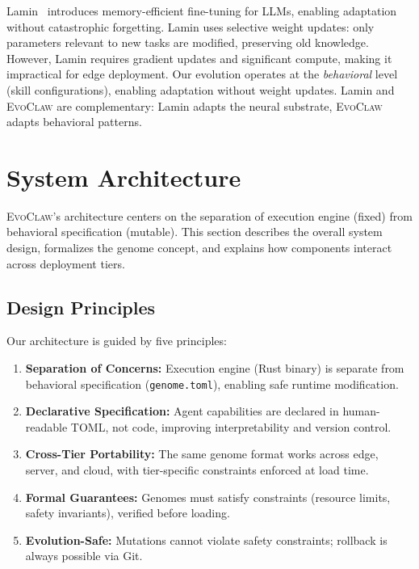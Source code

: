 \documentclass{article}
\newcommand{\evoclaw}{\textsc{EvoClaw}}
\newcommand{\genome}{\texttt{genome.toml}}
\begin{document}
Lamin~\cite{lamar2023lamin} introduces memory-efficient fine-tuning for LLMs, enabling adaptation without catastrophic forgetting. Lamin uses selective weight updates: only parameters relevant to new tasks are modified, preserving old knowledge. However, Lamin requires gradient updates and significant compute, making it impractical for edge deployment. Our evolution operates at the \textit{behavioral} level (skill configurations), enabling adaptation without weight updates. Lamin and \evoclaw{} are complementary: Lamin adapts the neural substrate, \evoclaw{} adapts behavioral patterns.


\section{System Architecture}
\label{sec:architecture}

\evoclaw{}'s architecture centers on the separation of execution engine (fixed) from behavioral specification (mutable). This section describes the overall system design, formalizes the genome concept, and explains how components interact across deployment tiers.

\subsection{Design Principles}

Our architecture is guided by five principles:

\begin{enumerate}[leftmargin=*]
    \item \textbf{Separation of Concerns:} Execution engine (Rust binary) is separate from behavioral specification (\genome{}), enabling safe runtime modification.
    
    \item \textbf{Declarative Specification:} Agent capabilities are declared in human-readable TOML, not code, improving interpretability and version control.
    
    \item \textbf{Cross-Tier Portability:} The same genome format works across edge, server, and cloud, with tier-specific constraints enforced at load time.
    
    \item \textbf{Formal Guarantees:} Genomes must satisfy constraints (resource limits, safety invariants), verified before loading.
    
    \item \textbf{Evolution-Safe:} Mutations cannot violate safety constraints; rollback is always possible via Git.
\end{enumerate}
\end{document}
